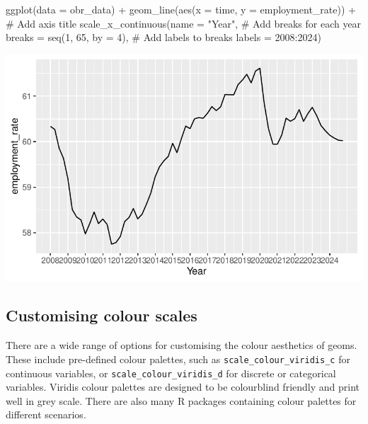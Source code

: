 \documentclass[
  letterpaper,
  DIV=11,
  numbers=noendperiod]{scrreprt}
\newenvironment{Shaded}{\begin{snugshade}}{\end{snugshade}}
\newcommand{\AttributeTok}[1]{\textcolor[rgb]{0.40,0.45,0.13}{#1}}
\newcommand{\CommentTok}[1]{\textcolor[rgb]{0.37,0.37,0.37}{#1}}
\newcommand{\DecValTok}[1]{\textcolor[rgb]{0.68,0.00,0.00}{#1}}
\newcommand{\FunctionTok}[1]{\textcolor[rgb]{0.28,0.35,0.67}{#1}}
\newcommand{\NormalTok}[1]{\textcolor[rgb]{0.00,0.23,0.31}{#1}}
\newcommand{\SpecialCharTok}[1]{\textcolor[rgb]{0.37,0.37,0.37}{#1}}
\newcommand{\StringTok}[1]{\textcolor[rgb]{0.13,0.47,0.30}{#1}}
\begin{document}
\begin{Shaded}
\begin{Highlighting}[]
\FunctionTok{ggplot}\NormalTok{(}\AttributeTok{data =}\NormalTok{ obr\_data) }\SpecialCharTok{+}
  \FunctionTok{geom\_line}\NormalTok{(}\FunctionTok{aes}\NormalTok{(}\AttributeTok{x =}\NormalTok{ time, }\AttributeTok{y =}\NormalTok{ employment\_rate)) }\SpecialCharTok{+}
  \CommentTok{\# Add axis title}
  \FunctionTok{scale\_x\_continuous}\NormalTok{(}\AttributeTok{name =} \StringTok{"Year"}\NormalTok{, }
                     \CommentTok{\# Add breaks for each year}
                     \AttributeTok{breaks =} \FunctionTok{seq}\NormalTok{(}\DecValTok{1}\NormalTok{, }\DecValTok{65}\NormalTok{, }\AttributeTok{by =} \DecValTok{4}\NormalTok{),}
                     \CommentTok{\# Add labels to breaks}
                     \AttributeTok{labels =} \DecValTok{2008}\SpecialCharTok{:}\DecValTok{2024}\NormalTok{)}
\end{Highlighting}
\end{Shaded}

\includegraphics{visualisation_files/figure-pdf/line graph-1.pdf}

\subsection{Customising colour scales}\label{customising-colour-scales}

There are a wide range of options for customising the colour aesthetics
of geoms. These include pre-defined colour palettes, such as
\texttt{scale\_colour\_viridis\_c} for continuous variables, or
\texttt{scale\_colour\_viridis\_d} for discrete or categorical
variables. Viridis colour palettes are designed to be colourblind
friendly and print well in grey scale. There are also many R packages
containing colour palettes for different scenarios.
\end{document}
